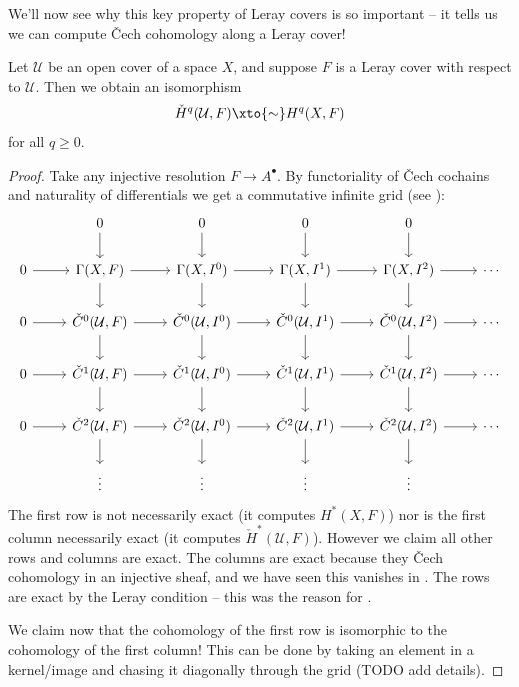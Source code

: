 \documentclass[11pt]{amsart}
\begin{document}
We'll now see why this key property of Leray covers is so important -- it tells us we can compute \v{C}ech cohomology along a Leray cover!

\begin{theorem}\label{thm:leray} 
Let $\mathcal{U}$ be an open cover of a space $X$, and suppose $F$ is a Leray cover with respect to $\mathcal{U}$. Then we obtain an isomorphism
\begin{align*}
    \check{H}^q(\mathcal{U},F) \xto{\sim} H^q(X,F)
\end{align*}
for all $q\ge0$.
\end{theorem}
\begin{proof} Take any injective resolution $F \to A^\bullet$. By functoriality of \v{C}ech cochains and naturality of differentials we get a commutative infinite grid (see \cite[p.~193]{Bredon-sheaf}):
\[ \begin{tikzcd}
     & 0\dar & 0\dar & 0\dar & 0\dar & \\
    0\rar & {\Gamma(X,F)}\rar\dar & {\Gamma(X,I^0)}\rar\dar & {\Gamma(X,I^1)}\rar\dar & {\Gamma(X,I^2)}\rar\dar & \cdots\\
    0\rar & {\check{C}^0(\mathcal{U},F)}\rar\dar & {\check{C}^0(\mathcal{U},I^0)}\rar\dar & {\check{C}^0(\mathcal{U},I^1)}\rar\dar  & {\check{C}^0(\mathcal{U},I^2)}\rar\dar  & \cdots \\
    0\rar & {\check{C}^1(\mathcal{U},F)}\rar\dar & {\check{C}^1(\mathcal{U},I^0)}\rar\dar & {\check{C}^1(\mathcal{U},I^1)}\rar\dar  & {\check{C}^1(\mathcal{U},I^2)}\rar\dar  & \cdots \\
    0\rar & {\check{C}^2(\mathcal{U},F)}\rar\dar & {\check{C}^2(\mathcal{U},I^0)}\rar\dar & {\check{C}^2(\mathcal{U},I^1)}\rar\dar  & {\check{C}^2(\mathcal{U},I^2)}\rar\dar  & \cdots \\
    & \vdots  & \vdots  & \vdots  & \vdots  & 
\end{tikzcd} \]
The first row is not necessarily exact (it computes $H^\ast(X,F)$) nor is the first column necessarily exact (it computes $\check{H}^\ast(\mathcal{U},F)$). However we claim all other rows and columns are exact. The columns are exact because they \v{C}ech cohomology in an injective sheaf, and we have seen this vanishes in . The rows are exact by the Leray condition -- this was the reason for .

We claim now that the cohomology of the first row is isomorphic to the cohomology of the first column! This can be done by taking an element in a kernel/image and chasing it diagonally through the grid (TODO add details).
\end{proof}
\end{document}
